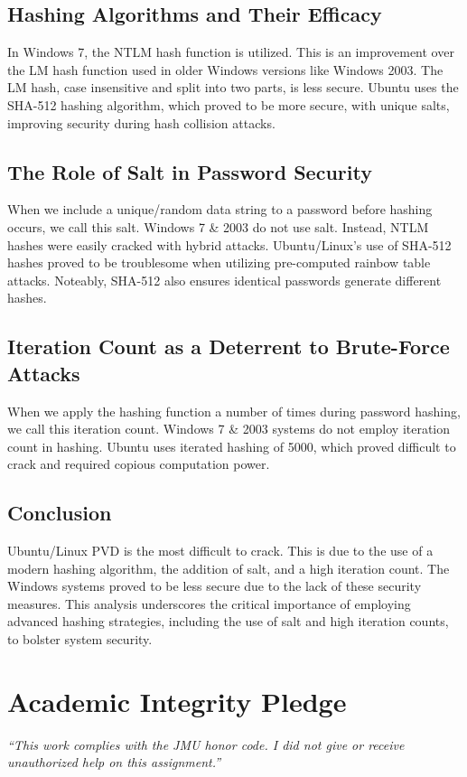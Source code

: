 \documentclass{article}
\begin{document}
\subsection{Hashing Algorithms and Their Efficacy}
In Windows 7, the NTLM hash function is utilized. This is an improvement over the LM hash function used in older Windows versions like Windows 2003. The LM hash, case insensitive and split into two parts, is less secure. Ubuntu uses the SHA-512 hashing algorithm, which proved to be more secure, with unique salts, improving security during hash collision attacks.

\subsection{The Role of Salt in Password Security}
When we include a unique/random data string to a password before hashing occurs, we call this salt. Windows 7 \& 2003 do not use salt. Instead, NTLM hashes were easily cracked with hybrid attacks. Ubuntu/Linux's use of SHA-512 hashes proved to be troublesome when utilizing pre-computed rainbow table attacks. Noteably, SHA-512 also ensures identical passwords generate different hashes.

\subsection{Iteration Count as a Deterrent to Brute-Force Attacks}
When we apply the hashing function a number of times during password hashing, we call this iteration count. Windows 7 \& 2003 systems do not employ iteration count in hashing. Ubuntu uses iterated hashing of 5000, which proved difficult to crack and required copious computation power.

\subsection{Conclusion}
Ubuntu/Linux PVD is the most difficult to crack. This is due to the use of a modern hashing algorithm, the addition of salt, and a high iteration count. The Windows systems proved to be less secure due to the lack of these security measures. This analysis underscores the critical importance of employing advanced hashing strategies, including the use of salt and high iteration counts, to bolster system security.
\vfill 
  \section*{Academic Integrity Pledge}
   {\color{red}\textit{“This work complies with the JMU honor code. I did not give or receive unauthorized help on this assignment.”}}
\end{document}
